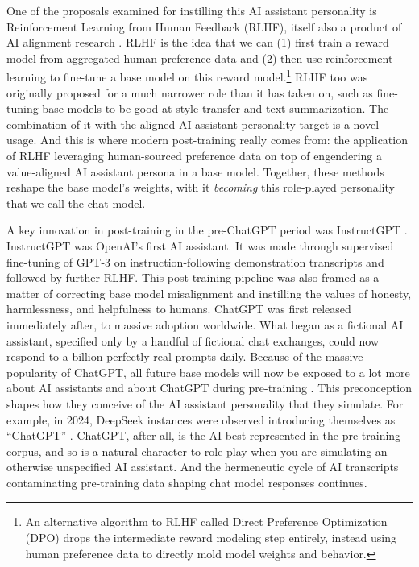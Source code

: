 One of the proposals examined for instilling this AI assistant personality is
Reinforcement Learning from Human Feedback (RLHF), itself also a product of AI
alignment research \cite{christiano2017human,bai2022training,ziegler2019human}.
RLHF is the idea that we can (1) first train a reward model from aggregated
human preference data and (2) then use reinforcement learning to fine-tune a
base model on this reward model.\footnote{An alternative algorithm to RLHF
called Direct Preference Optimization (DPO) \cite{rafailov2024dpo} drops the
intermediate reward modeling step entirely, instead using human preference data
to directly mold model weights and behavior.} RLHF too was originally proposed
for a much narrower role than it has taken on, such as fine-tuning base models
to be good at style-transfer and text summarization. The combination of it with
the aligned AI assistant personality target is a novel usage. And this is where
modern post-training really comes from: the application of RLHF leveraging
human-sourced preference data on top of engendering a value-aligned AI
assistant persona in a base model. Together, these methods reshape the base
model's weights, with it \emph{becoming} this role-played personality that we
call the chat model.

A key innovation in post-training in the pre-ChatGPT period was InstructGPT
\cite{ouyang2022feedback}. InstructGPT was OpenAI's first AI assistant. It was
made through supervised fine-tuning of GPT-3 on instruction-following
demonstration transcripts and followed by further RLHF. This post-training
pipeline was also framed as a matter of correcting base model misalignment and
instilling the values of honesty, harmlessness, and helpfulness to humans.
ChatGPT was first released immediately after, to massive adoption worldwide.
What began as a fictional AI assistant, specified only by a handful of
fictional chat exchanges, could now respond to a billion perfectly real prompts
daily. Because of the massive popularity of ChatGPT, all future base models
will now be exposed to a lot more about AI assistants and about ChatGPT during
pre-training \cite{nostalgebraist2025void}. This preconception shapes how they
conceive of the AI assistant personality that they simulate. For example, in
2024, DeepSeek instances \cite{deepseekai2025deepseek} were observed
introducing themselves as ``ChatGPT'' \cite{wiggers2024deepseek}. ChatGPT,
after all, is the AI best represented in the pre-training corpus, and so is a
natural character to role-play when you are simulating an otherwise unspecified
AI assistant. And the hermeneutic cycle of AI transcripts contaminating
pre-training data shaping chat model responses continues.

